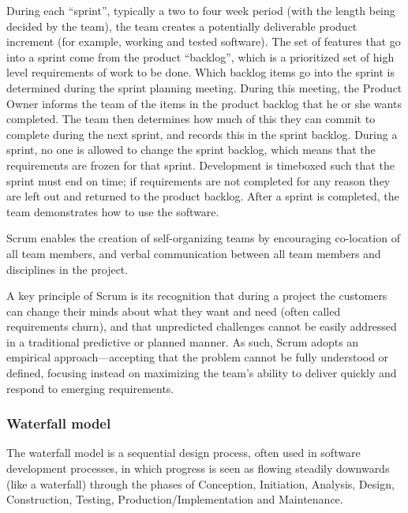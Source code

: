 	During each “sprint”, typically a two to four week period (with the length being decided by the team), the team creates a potentially deliverable product increment (for example, working and tested software). The set of features that go into a sprint come from the product “backlog”, which is a prioritized set of high level requirements of work to be done. Which backlog items go into the sprint is determined during the sprint planning meeting. During this meeting, the Product Owner informs the team of the items in the product backlog that he or she wants completed. The team then determines how much of this they can commit to complete during the next sprint, and records this in the sprint backlog. During a sprint, no one is allowed to change the sprint backlog, which means that the requirements are frozen for that sprint. Development is timeboxed such that the sprint must end on time; if requirements are not completed for any reason they are left out and returned to the product backlog. After a sprint is completed, the team demonstrates how to use the software.\newline
	
	Scrum enables the creation of self-organizing teams by encouraging co-location of all team members, and verbal communication between all team members and disciplines in the project.\newline
	
	A key principle of Scrum is its recognition that during a project the customers can change their minds about what they want and need (often called requirements churn), and that unpredicted challenges cannot be easily addressed in a traditional predictive or planned manner. As such, Scrum adopts an empirical approach—accepting that the problem cannot be fully understood or defined, focusing instead on maximizing the team’s ability to deliver quickly and respond to emerging requirements.\newline

	\subsubsection{Waterfall model}
	The waterfall model is a sequential design process, often used in software development processes, in which progress is seen as flowing steadily downwards (like a waterfall) through the phases of Conception, Initiation, Analysis, Design, Construction, Testing, Production/Implementation and Maintenance.\newline
	
